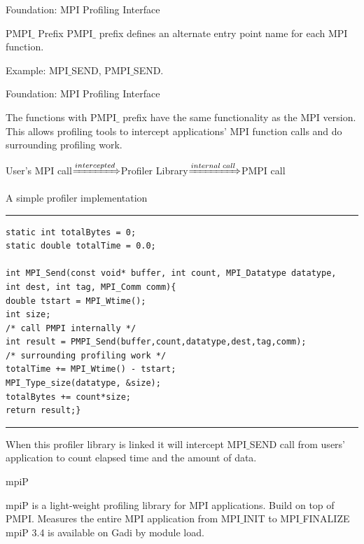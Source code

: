 \documentclass[xcolor=dvipsnames]{beamer}
\begin{document}
\begin{frame}{Foundation: MPI Profiling Interface}
\begin{block}{PMPI$\_$ Prefix \cite{mpi40}}
PMPI$\_$ prefix defines an alternate entry point name for each MPI function.
\end{block}
Example: MPI$\_$SEND, PMPI$\_$SEND.
\end{frame}

\begin{frame}{Foundation: MPI Profiling Interface}
\begin{outline}
\1 The functions with PMPI$\_$ prefix have the same functionality as the MPI version.
\2 This allows profiling tools to intercept applications' MPI function calls and do surrounding profiling work.
\end{outline}
\begin{block}{}
User's MPI call$\xRightarrow[]{intercepted}$Profiler Library$\xRightarrow[]{internal\; call}$PMPI call
\end{block}
\end{frame}

\begin{frame}[fragile]{A simple profiler implementation \cite{mpi40}}
\rule{\textwidth}{1pt}
\scriptsize
\begin{verbatim}
static int totalBytes = 0;
static double totalTime = 0.0;

int MPI_Send(const void* buffer, int count, MPI_Datatype datatype,
int dest, int tag, MPI_Comm comm){
double tstart = MPI_Wtime();
int size;
/* call PMPI internally */
int result = PMPI_Send(buffer,count,datatype,dest,tag,comm);
/* surrounding profiling work */
totalTime += MPI_Wtime() - tstart;
MPI_Type_size(datatype, &size);
totalBytes += count*size;
return result;}
\end{verbatim}
\rule{\textwidth}{1pt}
When this profiler library  is linked it will intercept MPI$\_$SEND call from users' application to count elapsed time and the amount of data.  
\end{frame}

\begin{frame}{mpiP}
\begin{outline}
\1 mpiP is a light-weight profiling library for MPI applications.
\2 Build on top of PMPI.
\2 Measures the entire MPI application from MPI$\_$INIT to MPI$\_$FINALIZE
\1 mpiP 3.4 is available on Gadi by module load.
\end{outline}
\end{frame}
\end{document}
